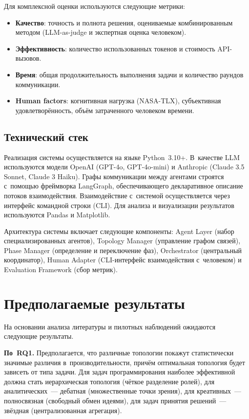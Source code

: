 \documentclass[12pt, a4paper]{article}
\begin{document}
Для комплексной оценки используются следующие метрики:
\begin{itemize}[noitemsep]
    \item \textbf{Качество}: точность и полнота решения, оцениваемые комбинированным методом (LLM-as-judge и экспертная оценка человеком).
    \item \textbf{Эффективность}: количество использованных токенов и стоимость API-вызовов.
    \item \textbf{Время}: общая продолжительность выполнения задачи и количество раундов коммуникации.
    \item \textbf{Human factors}: когнитивная нагрузка (NASA-TLX), субъективная удовлетворённость, объём затраченного человеком времени.
\end{itemize}

\subsection{Технический стек}

Реализация системы осуществляется на языке Python~3.10+. В~качестве LLM используются модели OpenAI (GPT-4o, GPT-4o-mini) и Anthropic (Claude 3.5 Sonnet, Claude 3 Haiku). Графы коммуникации между агентами строятся с~помощью фреймворка LangGraph, обеспечивающего декларативное описание потоков взаимодействия. Взаимодействие с~системой осуществляется через интерфейс командной строки (CLI). Для анализа и визуализации результатов используются Pandas и Matplotlib.

Архитектура системы включает следующие компоненты: Agent Layer (набор специализированных агентов), Topology Manager (управление графом связей), Phase Manager (определение и переключение фаз), Orchestrator (центральный координатор), Human Adapter (CLI-интерфейс взаимодействия с~человеком) и Evaluation Framework (сбор метрик).


\section{Предполагаемые результаты}

На основании анализа литературы и пилотных наблюдений ожидаются следующие результаты.

\textbf{По~RQ1.} Предполагается, что различные топологии покажут статистически значимые различия в~производительности, причём оптимальная топология будет зависеть от типа задачи. Для задач программирования наиболее эффективной должна стать иерархическая топология (чёткое разделение ролей), для аналитических~--- дебатная (множественные точки зрения), для креативных~--- полносвязная (свободный обмен идеями), для задач принятия решений~--- звёздная (централизованная агрегация).
\end{document}
